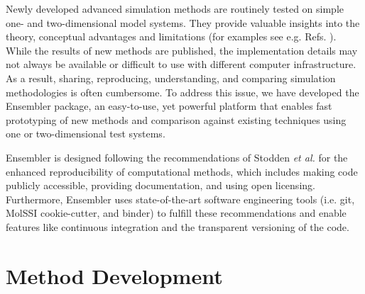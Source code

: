 Newly developed advanced simulation methods are routinely tested on simple one- and two-dimensional model systems. They provide valuable insights into the theory, conceptual advantages and limitations (for examples see e.g. Refs. \cite{Huber1994, Laio2002, Christ2007, Konig2012a, Koenig2020, Donnini2016, Weiß2016, Lemke2018}).
While the results of new methods are published, the implementation details may not always be available or difficult to use with different computer infrastructure.
As a result, sharing, reproducing, understanding, and comparing simulation methodologies is often cumbersome.\cite{Peng2011}
To address this issue, we have developed the Ensembler package, an easy-to-use, yet powerful platform that enables fast prototyping of new methods and comparison against existing techniques using one or two-dimensional test systems.

Ensembler is designed following the recommendations of Stodden \textit{et al.}\cite{Stodden2016} for the enhanced reproducibility of computational methods, which includes making code publicly accessible, providing documentation, and using open licensing.\cite{Stodden2016} 
Furthermore, Ensembler uses state-of-the-art software engineering tools (i.e. git,\cite{Chacon2014} MolSSI cookie-cutter,\cite{Naden2018} and binder\cite{Jupyter2018}) to fulfill these recommendations and enable features like continuous integration and the transparent versioning of the code. 

\section{Method Development}

